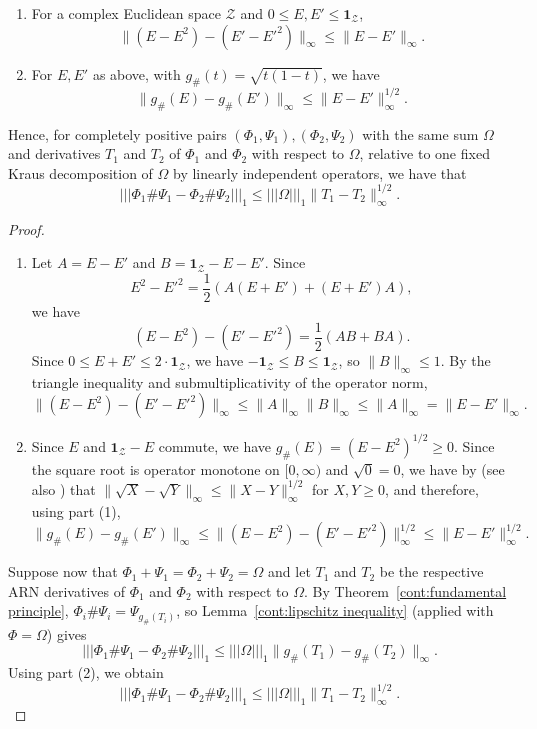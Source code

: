 \begin{proposition}\label{cont:K6}
\begin{enumerate}
    \item For a complex Euclidean space $\mathcal{Z}$ and $0\leq E,E'\leq \mathbf{1}_{\mathcal{Z}}$, 
    \[\|(E-E^2)-(E'-E'^2)\|_\infty\leq \|E-E'\|_\infty.\]
    \item For $E,E'$ as above, with $g_\#(t)=\sqrt{t(1-t)}$, we have 
    \[
        \|g_\#(E)-g_\#(E')\|_\infty\leq \|E-E'\|_\infty^{1/2}.
    \]
\end{enumerate}
Hence, for completely positive pairs $(\Phi_1,\Psi_1), (\Phi_2,\Psi_2)$ with the same sum $\Omega$ and derivatives $T_1$ and $T_2$ of $\Phi_1$ and $\Phi_2$ with respect to $\Omega$, relative to one fixed Kraus decomposition of $\Omega$ by linearly independent operators, we have that 
\[
    |||\Phi_1\#\Psi_1-\Phi_2\#\Psi_2|||_1\leq |||\Omega|||_1\|T_1-T_2\|_\infty^{1/2}.
\]
\end{proposition}
\begin{proof}
    \begin{enumerate}
        \item Let $A=E-E'$ and $B=\mathbf{1}_{\mathcal{Z}}-E-E'$. Since 
        \[
            E^2-E'^2=\frac{1}{2}(A(E+E')+(E+E')A),
        \]
        we have 
        \[
            (E-E^2)-(E'-E'^2)=\frac{1}{2}(AB+BA).
        \]
        Since $0\leq E+E'\leq 2\cdot\mathbf{1}_{\mathcal{Z}}$, we have $-\mathbf{1}_{\mathcal{Z}}\leq B\leq\mathbf{1}_{\mathcal{Z}}$, so $\|B\|_\infty\leq 1$. By the triangle inequality and submultiplicativity of the operator norm, 
        \[\|(E-E^2)-(E'-E'^2)\|_\infty\leq \|A\|_\infty\|B\|_\infty\leq \|A\|_\infty=\|E-E'\|_\infty.\]
        \item Since $E$ and $\mathbf{1}_{\mathcal{Z}}-E$ commute, we have $g_{\#}(E)=(E-E^2)^{1/2}\geq 0$. Since the square root is operator monotone on $[0,\infty)$ and $\sqrt{0}=0$, we have by \cite{Ando1988} (see also \cite[Theorem~X.1.1]{bhatia1997matrix}) that $\|\sqrt{X}-\sqrt{Y}\|_\infty\leq\|X-Y\|_\infty^{1/2}$ for $X,Y\geq 0$, and therefore, using part (1),
        \[
            \|g_\#(E)-g_\#(E')\|_\infty\leq \|(E-E^2)-(E'-E'^2)\|_\infty^{1/2}\leq \|E-E'\|_\infty^{1/2}.
        \] 
    \end{enumerate}
    Suppose now that $\Phi_1+\Psi_1=\Phi_2+\Psi_2=\Omega$ and let $T_1$ and $T_2$ be the respective ARN derivatives of $\Phi_1$ and $\Phi_2$ with respect to $\Omega$. By Theorem~\ref{cont:fundamental principle}, $\Phi_i\#\Psi_i=\Psi_{g_\#(T_i)}$, so Lemma~\ref{cont:lipschitz inequality} (applied with $\Phi=\Omega$) gives
    \[
        |||\Phi_1\#\Psi_1-\Phi_2\#\Psi_2|||_1\leq |||\Omega|||_1\|g_{\#}(T_1)-g_{\#}(T_2)\|_\infty.
    \]
    Using part (2), we obtain 
    \[
        |||\Phi_1\#\Psi_1-\Phi_2\#\Psi_2|||_1\leq |||\Omega|||_1\|T_1-T_2\|_\infty^{1/2}.
    \]
\end{proof}
 
